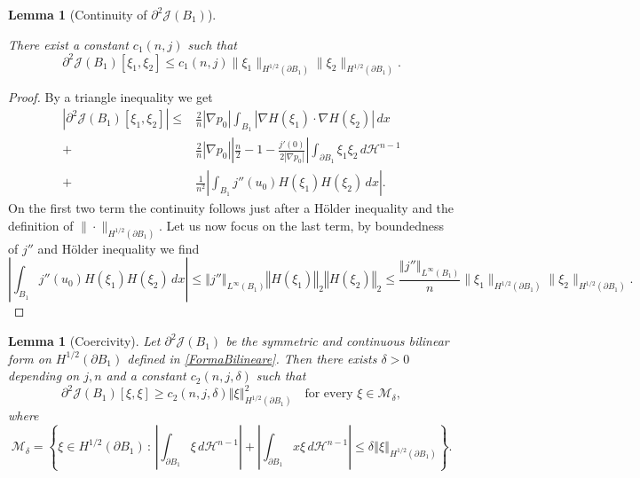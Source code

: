 \documentclass[oneside,a4paper,11pt,notitlepage]{article}
\newcommand{\abs}[1]{{\left|#1\right|}}
\newcommand{\norma}[1]{{\left\Vert#1\right\Vert}}
\theoremstyle{definition}
\theoremstyle{plain}
\newtheorem{lemma}[theorem]{Lemma}
\theoremstyle{definition}
\begin{document}
\begin{lemma}[Continuity of $\partial^2\mathcal{J}(B_1)$]\label{continuitàforma}

There exist a constant $c_1(n,j)$ such that
\begin{equation*}
    \partial^2\mathcal{J}(B_1)[\xi_1,\xi_2]\leq c_1(n,j)\|\xi_1\|_{H^{1/2}(\partial B_1)}\|\xi_2\|_{H^{1/2}(\partial B_1)}.
\end{equation*}
\end{lemma}
\begin{proof}
    By a triangle inequality we get
    \begin{equation*}
        \begin{split}
            \abs{\partial^2\mathcal{J}(B_1)[\xi_1,\xi_2]}\leq& \frac{2}{n}\abs{\nabla p_0}\int_{B_1}\abs{\nabla H(\xi_1) \cdot \nabla H(\xi_2)}\,dx\\
            +&\frac{2}{n}\abs{\nabla p_0}\abs{\frac{n}{2}-1-\frac{j'(0)}{2\abs{\nabla p_0}}}\int_{\partial B_1}\xi_1\xi_2\,d\mathcal{H}^{n-1}\\
            +&\frac{1}{n^2}\abs{\int_{B_1}j''(u_0)H(\xi_1)H(\xi_2)\,dx}.
        \end{split}
    \end{equation*}
    On the first two term the continuity follows just after a H\"older inequality and the definition of $\|\cdot\|_{H^{1/2}(\partial B_1)}$. Let us now focus on the last term, by boundedness of $j''$ and H\"older inequality we find
    \begin{equation*}
        \abs{\int_{B_1}j''(u_0)H(\xi_1)H(\xi_2)\,dx}\leq\norma{j''}_{L^\infty(B_1)}\norma{H(\xi_1)}_2\norma{H(\xi_2)}_2\leq\frac{\norma{j''}_{L^\infty(B_1)}}{n}\|\xi_1\|_{H^{1/2}(\partial B_1)}\|\xi_2\|_{H^{1/2}(\partial B_1)}.
    \end{equation*}
\end{proof}
\begin{lemma}[Coercivity]\label{Coercività2}
    Let $\partial^2 \mathcal{J}(B_1)$ be the symmetric and continuous bilinear form on $H^{1/2}(\partial B_1)$ defined in \eqref{FormaBilineare}. Then there exists $\delta>0$ depending on $j,n$ and a constant $c_2(n,j,\delta)$ such that 
    \begin{equation*}
        \partial^2\mathcal{J}(B_1)[\xi,\xi]\geq c_2(n,j,\delta)\norma{\xi}_{H^{1/2}(\partial B_1)}^2\quad\text{for every }\xi\in \mathcal{M}_\delta,
    \end{equation*}
    where
        \begin{equation*}
        \mathcal{M}_\delta=\left\{\xi\in H^{1/2}(\partial B_1)\,:\, \abs{\int_{\partial B_1}\xi\,d\mathcal{H}^{n-1}}+\abs{\int_{\partial B_1}x\xi\,d\mathcal{H}^{n-1}}\leq\delta\norma{\xi}_{H^{1/2}(\partial B_1)}\right\}.
    \end{equation*}
\end{lemma}
\end{document}

